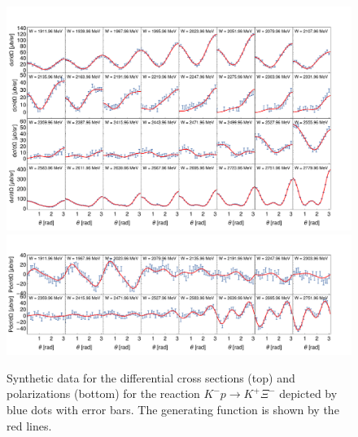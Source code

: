 \documentclass[10pt,aps,prc,superscriptaddress,twoside,twocolumn,nofootinbib,showpacs,preprintnumbers]{revtex4-1}
\begin{document}
\begin{figure}
\centering
\includegraphics[width=0.99\linewidth, trim=0.5cm 1cm 1.5cm 1cm]{DiffCS-synth-1.pdf}
\includegraphics[width=0.99\linewidth, trim=0.5cm 0.5cm 1.5cm 0cm]{pDiffCS-synth-1.pdf}
\caption{Synthetic data for the differential cross sections (top) and polarizations (bottom) for the reaction $K^-p\to K^+\Xi^-$ depicted by blue dots with error bars. The generating function is shown by the red lines.
\label{fig:Fig3}}
\end{figure}
\end{document}
